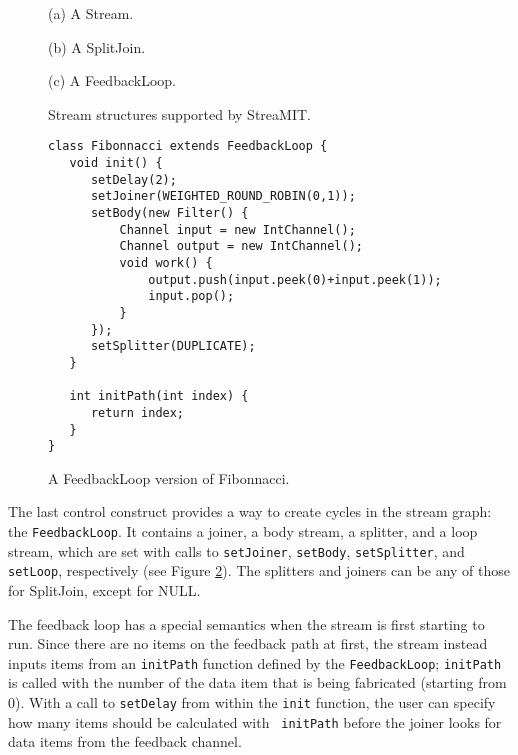 \begin{figure}
\centering
{}

(a) A Stream. \\
\vspace{8pt}

(b) A SplitJoin. \\
\vspace{8pt}

(c) A FeedbackLoop. \\
\vspace{8pt}
\caption{Stream structures supported by StreaMIT.}
\label{fig:structuresp}
\end{figure}

\begin{figure}
\scriptsize
\begin{verbatim}
class Fibonnacci extends FeedbackLoop {
   void init() {
      setDelay(2);
      setJoiner(WEIGHTED_ROUND_ROBIN(0,1));
      setBody(new Filter() {
          Channel input = new IntChannel();
          Channel output = new IntChannel();
          void work() {
              output.push(input.peek(0)+input.peek(1));
              input.pop();
          }
      });
      setSplitter(DUPLICATE);
   }

   int initPath(int index) {
      return index;
   }
}
\end{verbatim}
\vspace{-12pt}
\caption{\protect\small A FeedbackLoop version of Fibonnacci.
\protect\label{fig:feed}}
\vspace{-12pt}
\end{figure}

The last control construct provides a way to create cycles in the
stream graph: the {\tt FeedbackLoop}.  It contains a joiner, a body
stream, a splitter, and a loop stream, which are set with calls to
{\tt setJoiner}, {\tt setBody}, {\tt setSplitter}, and {\tt setLoop},
respectively (see Figure \ref{fig:feed}).  The splitters and joiners
can be any of those for SplitJoin, except for NULL.

The feedback loop has a special semantics when the stream is first
starting to run.  Since there are no items on the feedback path at
first, the stream instead inputs items from an {\tt initPath} function
defined by the {\tt FeedbackLoop}; {\tt initPath} is called with the
number of the data item that is being fabricated (starting from 0).
With a call to {\tt setDelay} from within the {\tt init} function, the
user can specify how many items should be calculated with {\tt
initPath} before the joiner looks for data items from the feedback
channel.


